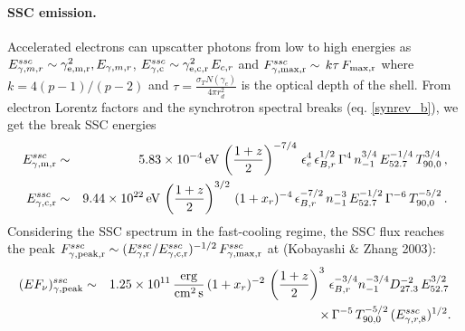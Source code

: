 \documentclass[11pt,twoside]{article}
\newcommand{\bary}{\begin{eqnarray}}
\newcommand{\eary}{\end{eqnarray}}
\begin{document}
\paragraph{SSC emission.}
%
Accelerated electrons can upscatter photons from low to high energies as $E^{ssc}_{\gamma,m,r}\sim\gamma^2_{\rm e,m,r},E_{\gamma,m,r}$,  $E^{ssc}_{\rm \gamma,c}\sim\gamma^2_{\rm e,c,r}\,E_{c,r}$ and $F^{ssc}_{\rm\gamma,max,r}\sim\,k\tau\,F_{\rm max,r}$ where $k=4(p-1)/(p-2)$ and $\tau=\frac{\sigma_T N(\gamma_e)}{4\pi r_d^2}$ is the optical depth of the shell.  From electron Lorentz factors and the synchrotron spectral breaks (eq. \ref{synrev_b}),  we get the break SSC energies     
%
\bary\label{ssc_b}
E^{ssc}_{\rm \gamma,m,r}&\sim& 5.83\times 10^{-4}\, {\rm eV}   \,\left(\frac{1+z}{2}\right)^{-7/4}\,\epsilon_{e}^{4}\,\epsilon_{B,r}^{1/2}\,\Gamma^{4}\,n^{3/4}_{-1}\,E^{-1/4}_{52.7}\,T_{90,0}^{3/4}\,,\cr
E^{ssc}_{\rm \gamma,c,r}&\sim& 9.44\times 10^{22}\, {\rm eV}  \,\left(\frac{1+z}{2}\right)^{3/2}\,(1+x_r)^{-4}\,\epsilon_{B,r}^{-7/2}\,n^{-3}_{-1}\,E^{-1/2}_{52.7}\,\Gamma^{-6}\,T_{90,0}^{-5/2}\,.
\eary
%
%
%
Considering the SSC spectrum in the fast-cooling regime,  the SSC flux reaches the peak $F^{ssc}_{\rm \gamma,peak,r}\sim (E^{ssc}_{\rm \gamma,r}/ E^{ssc}_{\rm \gamma,c,r})^{-1/2}\,F^{ssc}_{\rm \gamma,max,r}$ at (Kobayashi \& Zhang 2003):
%
\bary\label{ssc_peak}
(EF_\nu)^{ssc}_{\rm \gamma,peak}&\sim& 1.25\times 10^{11}\,{\rm \frac{erg}{cm^2\,s}}\,(1+x_r)^{-2}\,\left(\frac{1+z}{2}\right)^3\,\epsilon_{B,r}^{-3/4}n^{-3/4}_{-1}D^{-2}_{27.3}\,E^{3/2}_{52.7}\,\cr
&&\hspace{5.5cm}\times\, \Gamma^{-5}\,T_{90,0}^{-5/2}\,(E^{ssc}_{\gamma,r,8})^{1/2}.
\eary
%
%
%
\end{document}
